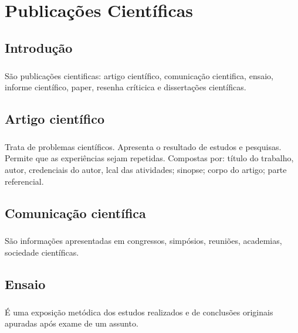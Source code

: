 \chapter{Publicações Científicas}

\section{Introdução}

\paragraph{}
São publicações cientificas: artigo científico, comunicação cientifica, ensaio, informe científico, paper, resenha críticica e dissertações científicas.

\section{Artigo científico}

\paragraph{}
Trata de problemas científicos. Apresenta o resultado de estudos e pesquisas. Permite que as experiências sejam repetidas. Compostas por: título do trabalho, autor, credenciais do autor, lcal das atividades; sinopse; corpo do artigo; parte referencial.

\section{Comunicação científica}

\paragraph{}
São informações apresentadas em congressos, simpósios, reuniões, academias, sociedade científicas.

\section{Ensaio}

\paragraph{}
É uma exposição metódica dos estudos realizados e de conclusões originais apuradas após exame de um assunto.

